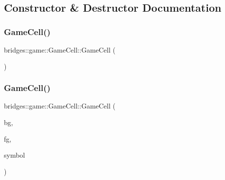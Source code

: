 \subsection{Constructor \& Destructor Documentation}
\mbox{\label{classbridges_1_1game_1_1_game_cell_a750114853f2f0f7519cb663352230868}} 
\subsubsection{\texorpdfstring{Game\+Cell()}{GameCell()}\hspace{0.1cm}{\footnotesize\ttfamily [1/2]}}
{\footnotesize\ttfamily bridges\+::game\+::\+Game\+Cell\+::\+Game\+Cell (\begin{DoxyParamCaption}{ }\end{DoxyParamCaption})\hspace{0.3cm}{\ttfamily [inline]}}

\mbox{\label{classbridges_1_1game_1_1_game_cell_a743b618fc8553aa9aac33ddc3bb65a79}} 
\subsubsection{\texorpdfstring{Game\+Cell()}{GameCell()}\hspace{0.1cm}{\footnotesize\ttfamily [2/2]}}
{\footnotesize\ttfamily bridges\+::game\+::\+Game\+Cell\+::\+Game\+Cell (\begin{DoxyParamCaption}\item[{\mbox{\hyperlink{namespacebridges_1_1game_afaa832a4322b25b6a4ebfba832f10f26}{Named\+Color}}}]{bg,  }\item[{\mbox{\hyperlink{namespacebridges_1_1game_afaa832a4322b25b6a4ebfba832f10f26}{Named\+Color}}}]{fg,  }\item[{\mbox{\hyperlink{namespacebridges_1_1game_ab9a19c7ab6e2ebac2f95180e21733487}{Named\+Symbol}}}]{symbol }\end{DoxyParamCaption})\hspace{0.3cm}{\ttfamily [inline]}}



